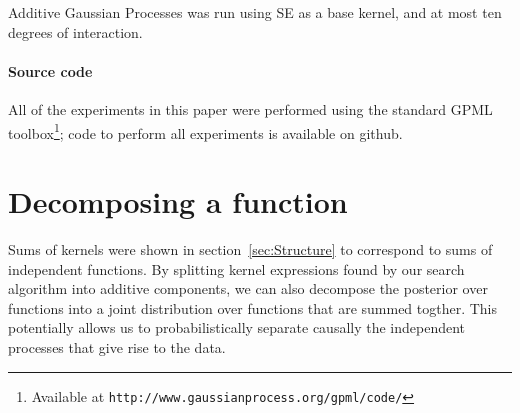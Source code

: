 \documentclass[twoside]{article}
\begin{document}
{Additive Gaussian Processes was run using SE as a base kernel, and at most ten degrees of interaction. 

\paragraph{Source code}All of the experiments in this paper were performed using the standard GPML toolbox\footnote{Available at \texttt{http://www.gaussianprocess.org/gpml/code/}}; code to perform all experiments is available on github.






\section{Decomposing a function}
\label{sec:decomposing}
Sums of kernels were shown in section~\ref{sec:Structure} to correspond to sums of independent functions.
By splitting kernel expressions found by our search algorithm into additive components, we can also decompose the \gp{} posterior over functions into a joint distribution over functions that are summed togther.
This potentially allows us to probabilistically separate causally the independent processes that give rise to the data. 


}
\end{document}
